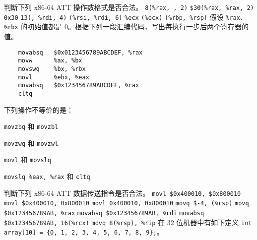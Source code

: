     \begin{problems}
        \pro 判断下列 x86-64 ATT 操作数格式是否合法。
            \qn \verb|8(%rax, , 2)|
            \qn \verb|$30(%rax, %rax, 2)|
            \qn \verb|0x30|
            \qn \verb|13(, %rdi, 4)|
            \qn \verb|(%rsi, %rdi, 6)|
            \qn \verb|%ecx|
            \qn \verb|(%ecx)|
            \qn \verb|(%rbp, %rsp)|
        \pro 假设 \verb|%rax|、\verb|%rbx| 的初始值都是 0。根据下列一段汇编代码，写出每执行一步后两个寄存器的值。
        \begin{verbatim}
    movabsq   $0x0123456789ABCDEF, %rax
    movw      %ax, %bx
    movswq    %bx, %rbx
    movl      %ebx, %eax
    movabsq   $0x123456789ABCDEF, %rax
    cltq
        \end{verbatim}
        \pro 下列操作不等价的是：
        \begin{choices}
            \item \verb|movzbq| 和 \verb|movzbl|
            \item \verb|movzwq| 和 \verb|movzwl|
            \item \verb|movl| 和 \verb|movslq|
            \item \verb|movslq %eax, %rax| 和 \verb|cltq|
        \end{choices}
        \pro 判断下列 x86-64 ATT 数据传送指令是否合法。
            \qn \verb|movl $0x400010, $0x800010|
            \qn \verb|movl $0x400010, 0x800010|
            \qn \verb|movl 0x400010, 0x800010|
            \qn \verb|movq $-4, (%rsp)|
            \qn \verb|movq $0x123456789AB, %rax|
            \qn \verb|movabsq $0x123456789AB, %rdi|
            \qn \verb|movabsq $0x123456789AB, 16(%rcx)|
            \qn \verb|movq 8(%rsp), %rip|
        \pro 在 32 位机器中有如下定义 \texttt{int array[10] = \{0, 1, 2, 3, 4, 5, 6, 7, 8, 9\};}。
        

\end{problems}
